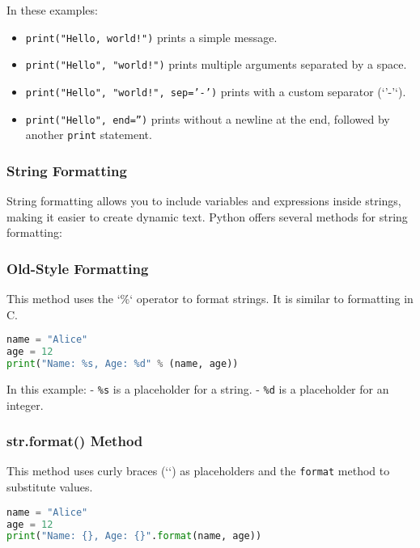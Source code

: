 In these examples:
\begin{itemize}
    \item \texttt{print("Hello, world!")} prints a simple message.
    \item \texttt{print("Hello", "world!")} prints multiple arguments separated by a space.
    \item \texttt{print("Hello", "world!", sep='-')} prints with a custom separator (`'-'`).
    \item \texttt{print("Hello", end='')} prints without a newline at the end, followed by another \texttt{print} statement.
\end{itemize}

\subsubsection{String Formatting}

String formatting allows you to include variables and expressions inside strings, making it easier to create dynamic text. Python offers several methods for string formatting:

\subsubsection{Old-Style Formatting}

This method uses the `\%` operator to format strings. It is similar to formatting in C.

\begin{lstlisting}[language=Python, caption=Old-Style String Formatting Example]
name = "Alice"
age = 12
print("Name: %s, Age: %d" % (name, age))
\end{lstlisting}

In this example:
- \texttt{\%s} is a placeholder for a string.
- \texttt{\%d} is a placeholder for an integer.

\subsubsection{str.format() Method}

This method uses curly braces (`{}`) as placeholders and the \texttt{format} method to substitute values.

\begin{lstlisting}[language=Python, caption=str.format() Method Example]
name = "Alice"
age = 12
print("Name: {}, Age: {}".format(name, age))
\end{lstlisting}

